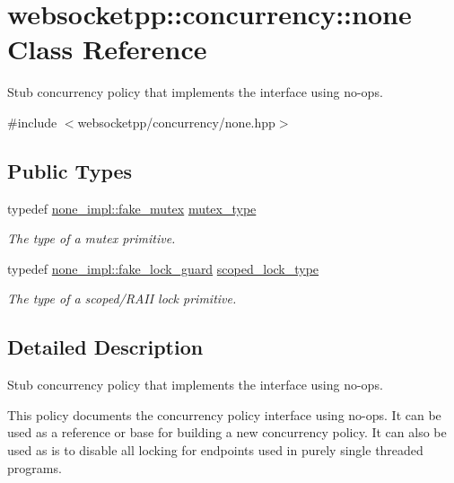 \hypertarget{classwebsocketpp_1_1concurrency_1_1none}{}\section{websocketpp\+:\+:concurrency\+:\+:none Class Reference}
\label{classwebsocketpp_1_1concurrency_1_1none}


Stub concurrency policy that implements the interface using no-\/ops.  




{\ttfamily \#include $<$websocketpp/concurrency/none.\+hpp$>$}

\subsection*{Public Types}
\begin{DoxyCompactItemize}
\item 
typedef \hyperlink{classwebsocketpp_1_1concurrency_1_1none__impl_1_1fake__mutex}{none\+\_\+impl\+::fake\+\_\+mutex} \hyperlink{classwebsocketpp_1_1concurrency_1_1none_a3cf002cfc62e64e920a91a06f5e6fbc3}{mutex\+\_\+type}
\begin{DoxyCompactList}\small\item\em The type of a mutex primitive. \end{DoxyCompactList}\item 
typedef \hyperlink{classwebsocketpp_1_1concurrency_1_1none__impl_1_1fake__lock__guard}{none\+\_\+impl\+::fake\+\_\+lock\+\_\+guard} \hyperlink{classwebsocketpp_1_1concurrency_1_1none_af2d121eeb6202694819578ba4bb00d3e}{scoped\+\_\+lock\+\_\+type}
\begin{DoxyCompactList}\small\item\em The type of a scoped/\+R\+A\+I\+I lock primitive. \end{DoxyCompactList}\end{DoxyCompactItemize}


\subsection{Detailed Description}
Stub concurrency policy that implements the interface using no-\/ops. 

This policy documents the concurrency policy interface using no-\/ops. It can be used as a reference or base for building a new concurrency policy. It can also be used as is to disable all locking for endpoints used in purely single threaded programs. 

